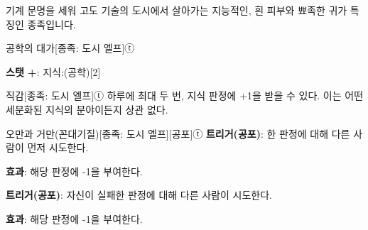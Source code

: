 \documentclass{report}
\begin{document}
	기계 문명을 세워 고도 기술의 도시에서 살아가는 지능적인, 흰 피부와 뾰족한 귀가 특징인 종족입니다.
	
	\begin{story}{공학의 대가}{[종족: 도시 엘프]ⓣ}
		
		\textbf{스탯 +}: 지식:(공학)[2]
		
	\end{story}
	
	\begin{story}{직감}{[종족: 도시 엘프]ⓣ}
		하루에 최대 두 번, 지식 판정에 +1을 받을 수 있다. 이는 어떤 세분화된 지식의 분야이든지 상관 없다.
		
	\end{story}
	
	\begin{story}{오만과 거만(꼰대기질)}{[종족: 도시 엘프][공포]ⓣ}
		\textbf{트리거(공포)}: 한 판정에 대해 다른 사람이 먼저 시도한다.
		
		\textbf{효과}: 해당 판정에 -1을 부여한다.
		
		\medskip
		
		\textbf{트리거(공포)}: 자신이 실패한 판정에 대해 다른 사람이 시도한다.
		
		\textbf{효과}: 해당 판정에 -1을 부여한다.
		
	\end{story}
\end{document}
